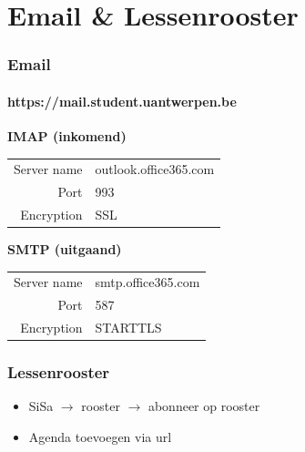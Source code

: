     \section{Email \& Lessenrooster}
	\begin{frame}
		\frametitle{Email}
		\framesubtitle{https://mail.student.uantwerpen.be}
        \begin{center}
        \end{center}
    	\textbf{IMAP (inkomend)}
        \begin{tabularx}{\linewidth}{rX}
          Server name & outlook.office365.com \\
          Port & 993 \\
          Encryption & SSL \\
		\end{tabularx} \vspace{0.5cm}
        
		\textbf{SMTP (uitgaand)}
        \begin{tabularx}{\linewidth}{rX}
          Server name & smtp.office365.com \\
          Port & 587 \\
          Encryption & STARTTLS \\
		\end{tabularx} \vspace{0.5cm}

        
	\end{frame}
    
	\begin{frame}
		\frametitle{Lessenrooster}
        \begin{itemize}
       	  \item SiSa $\rightarrow$ rooster $\rightarrow$ abonneer op rooster
          \item Agenda toevoegen via url
        \end{itemize}
	\end{frame}
    
